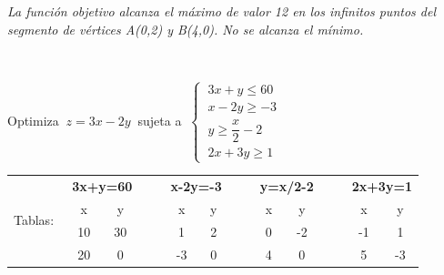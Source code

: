 \vspace{5mm} \emph{La función objetivo alcanza el máximo de valor 12 en los infinitos puntos del segmento de vértices A(0,2) y B(4,0). No se alcanza el mínimo.}

$\,$


\vspace{10mm}
\begin{ejemplo}
\begin{ejer}
	Optimiza $\ z=3x-2y\ $ sujeta a $\ \begin{cases}\ 3x+y\le 60\\ \ x-2y\ge -3 \\ \ y\ge \dfrac x 2 - 2 \\ \ 2x+3y\ge 1 \end{cases}$
\end{ejer}	
\end{ejemplo}
\vspace{5mm}

\begin{table}[H]
\centering
\begin{tabular}{lccccccccccc}
\multirow{4}{*}{Tablas:$\ \ $} & \multicolumn{2}{c}{\textbf{3x+y=60}} & \textbf{} & \multicolumn{2}{c}{\textbf{x-2y=-3}} & \textbf{} & \multicolumn{2}{c}{\textbf{y=x/2-2}} & \textbf{} & \multicolumn{2}{c}{\textbf{2x+3y=1}} \\
                         & \multicolumn{1}{c|}{x}      & y      & $\quad$   & \multicolumn{1}{c|}{x}       & y     & $\quad$   & \multicolumn{1}{c|}{x}      & y      & $\quad$   & \multicolumn{1}{c|}{x}      & y      \\ \cline{2-3} \cline{5-6} \cline{8-9} \cline{11-12} 
                         & \multicolumn{1}{c|}{10}     & 30     &           & \multicolumn{1}{c|}{1}       & 2     &           & \multicolumn{1}{c|}{0}      & -2     &           & \multicolumn{1}{c|}{-1}     & 1      \\
                         & \multicolumn{1}{c|}{20}     & 0      &           & \multicolumn{1}{c|}{-3}      & 0     &           & \multicolumn{1}{c|}{4}      & 0      &           & \multicolumn{1}{c|}{5}      & -3    
\end{tabular}
\end{table}

